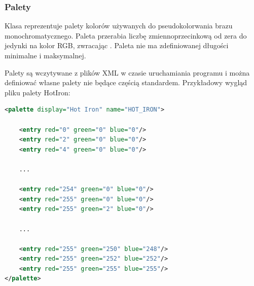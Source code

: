 \subsubsection{Palety}
Klasa  reprezentuje palety kolorów używanych do pseudokolorwania brazu monochromatycznego.
Paleta przerabia liczbę zmiennoprzecinkową od zera do jedynki na kolor RGB, zwracając .
Paleta nie ma zdefiniowanej długości minimalne i maksymalnej.

\par
Palety są wczytywane z plików XML w czasie uruchamiania programu i można definiować własne palety nie będące częścią standardem.
Przykładowy wygląd pliku palety HotIron:
\begin{lstlisting}[language=XML]
<palette display="Hot Iron" name="HOT_IRON">

    <entry red="0" green="0" blue="0"/>
    <entry red="2" green="0" blue="0"/>
    <entry red="4" green="0" blue="0"/>

    ...

    <entry red="254" green="0" blue="0"/>
    <entry red="255" green="0" blue="0"/>
    <entry red="255" green="2" blue="0"/>

    ...

    <entry red="255" green="250" blue="248"/>
    <entry red="255" green="252" blue="252"/>
    <entry red="255" green="255" blue="255"/>
</palette>
\end{lstlisting}